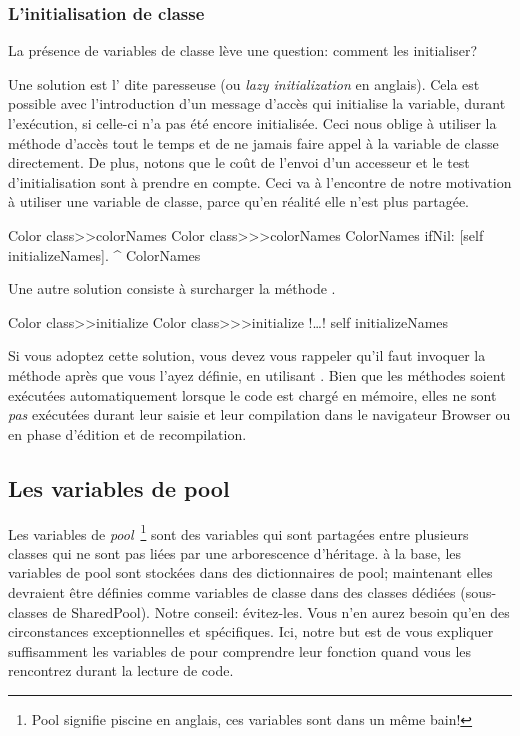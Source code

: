 \documentclass[a4paper,10pt,twoside]{book}
\begin{document}
\subsubsection{L'initialisation de classe}

La présence de variables de classe lève une question: comment les initialiser?

Une solution est l' dite paresseuse (ou \emph{lazy initialization} en anglais).
Cela est possible avec l'introduction d'un message d'accès qui
initialise la variable, durant l'exécution, si celle-ci n'a pas été
encore initialisée.
Ceci nous oblige à utiliser la méthode d'accès tout le temps et de ne jamais
faire appel à la variable de classe directement.
De plus, notons que le coût de l'envoi d'un accesseur et le test d'initialisation sont à prendre en compte.
Ceci va à l'encontre de notre motivation à utiliser une variable de classe, parce qu'en réalité elle n'est plus partagée.

\begin{method}[colorclasscolornames]{Color class>>colorNames}
Color class>>>colorNames	
	ColorNames ifNil: [self initializeNames].
	^ ColorNames
\end{method}	

Une autre solution consiste à surcharger la méthode .

\begin{method}[colorclassinit]{Color class>>initialize}
Color class>>>initialize	
	!\ldots!
	self initializeNames
\end{method}

\noindent
Si vous adoptez cette solution, vous devez vous rappeler qu'il faut
invoquer la méthode  après que vous l'ayez définie,
\eg en utilisant .
Bien que les méthodes   soient exécutées automatiquement lorsque le code est chargé en mémoire,
elles ne sont \emph{pas} exécutées durant leur saisie et leur compilation dans le navigateur Browser ou en phase d'édition et de recompilation.

\subsection{Les variables de pool}
Les variables de \emph{pool}~\footnote{Pool signifie piscine en anglais, ces variables sont dans un même bain!} sont des variables qui sont partagées entre plusieurs classes qui ne sont pas liées par une arborescence d'héritage.
à la base, les variables de pool sont stockées dans des dictionnaires
de pool;  maintenant elles devraient être définies comme variables
de classe dans des classes dédiées (sous-classes de SharedPool).
Notre conseil: évitez-les. Vous n'en aurez besoin qu'en des circonstances
exceptionnelles et spécifiques.
Ici, notre but est de vous expliquer suffisamment les variables de
 pour comprendre leur fonction quand vous les
rencontrez durant la lecture de code.
\end{document}
